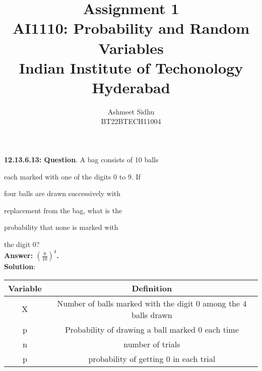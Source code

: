 \documentclass[journal,12pt]{IEEEtran}
\begin{document}
\vspace{3cm}

\title{
\textbf {Assignment 1}\\ \large \textbf{AI1110}: Probability and Random Variables\\Indian Institute of Techonology Hyderabad
}
\author{Ashmeet Sidhu\\BT22BTECH11004}
	


\maketitle

\newpage


\bigskip

\renewcommand{\thefigure}{\theenumi}
\renewcommand{\thetable}{\theenumi}

\textbf{12.13.6.13: Question}. A bag consists of 10 balls

 each marked with one of the digits 0 to 9. If

 four balls are drawn successively with

 replacement from the bag, what is the

 probability that none is marked with 

the digit 0?\\

\textbf{Answer: $\left(\frac{9}{10}\right)^4$.}\\

\textbf{Solution}:\\

\begin{tabular}{|c|c|}
\hline
Variable & Definition \\
\hline
X & Number of balls marked with the digit $0$ among the $4$ balls drawn \\
\hline
p & Probability of drawing a ball marked $0$ each time \\
\hline
n & number of trials \\
\hline
p & probability of getting $0$ in each trial \\
\hline
\end{tabular}\\



\end{document}
